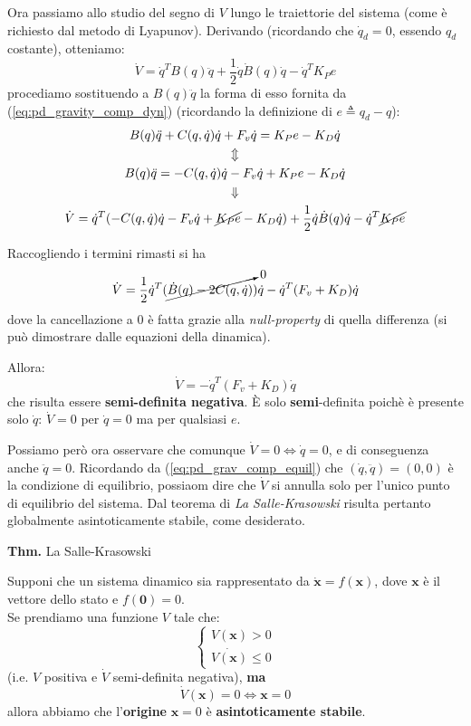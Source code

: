 Ora passiamo allo studio del segno di $V$ lungo le traiettorie del sistema (come è richiesto dal metodo di Lyapunov). Derivando (ricordando che $\dot{q}_d = 0$, essendo $q_d$ costante), otteniamo:
$$
\dot{V} = \dot{q}^TB(q)\ddot{q} + \frac{1}{2}\dot{q}\dot{B}(q)\dot{q} - \dot{q}^TK_Pe
$$
procediamo sostituendo a $B(q)\ddot{q}$ la forma di esso fornita da (\ref{eq:pd_gravity_comp_dyn}) (ricordando la definizione di $e \triangleq q_d - q$):
\begin{gather*}
	B(q)\ddot{q} + C(q, \dot{q})\dot{q} + F_v\dot{q} = K_Pe - K_D\dot{q} \\
	\Updownarrow \\
	B(q)\ddot{q} = -C(q, \dot{q})\dot{q} - F_v\dot{q} + K_Pe - K_D\dot{q} \\
	\Downarrow \\
	\dot{V} = \dot{q}^T( -C(q, \dot{q})\dot{q} - F_v\dot{q} + \cancel{K_Pe} - K_D\dot{q} ) + \frac{1}{2}\dot{q}\dot{B}(q)\dot{q} - \dot{q}^T \cancel{K_Pe}
\end{gather*}

Raccogliendo i termini rimasti si ha
$$
\dot{V} = \frac{1}{2} \dot{q}^T ( \cancelto{0}{ \dot{B}(q) - 2C(q, \dot{q}) })\dot{q} - \dot{q}^T (F_v + K_D)\dot{q}
$$
dove la cancellazione a 0 è fatta grazie alla \textit{null-property} di quella differenza (si può dimostrare dalle equazioni della dinamica).

Allora:
$$
\dot{V} = - \dot{q}^T (F_v + K_D)\dot{q}
$$
che risulta essere \textbf{semi-definita negativa}. È solo \textbf{semi}-definita poichè è presente solo $\dot{q}$: $\dot{V} = 0$ per $\dot{q} = 0$ ma per qualsiasi $e$.

Possiamo però ora osservare che comunque $\dot{V} = 0 \iff \dot{q} = 0$, e di conseguenza anche $\ddot{q} = 0$. Ricordando da (\ref{eq:pd_grav_comp_equil}) che $(\dot{q}, \ddot{q}) = (0,0)$ è la condizione di equilibrio, possiaom dire che $\dot{V}$ si annulla solo per l'unico punto di equilibrio del sistema.
Dal teorema di \textit{La Salle-Krasowski} risulta pertanto globalmente asintoticamente stabile, come desiderato.
\unboldmath

\vspace*{15pt}
\begin{addendum}
\textbf{Thm.} La Salle-Krasowski

Supponi che un sistema dinamico sia rappresentato da $\dot{\mathbf{x}}=f(\mathbf{x})$, dove $\mathbf{x}$ è il vettore dello stato e $f(\mathbf{0})=0$.\\
Se prendiamo una funzione $V$ tale che:
$$
\begin{cases}
	V(\mathbf{x}) > 0 \\
	\dot{V(\mathbf{x})} \leq 0
\end{cases}
$$
(i.e. $V$ positiva e $\dot{V}$ semi-definita negativa), \textbf{ma}
$$
\dot{V}(\mathbf{x}) = 0 \iff \mathbf{x} = 0
$$
allora abbiamo che l'\textbf{origine} $\mathbf{x} = 0$ è \textbf{asintoticamente stabile}.
\end{addendum}










